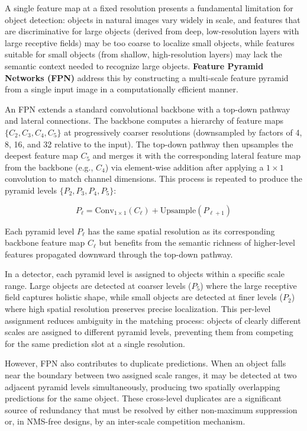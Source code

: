 \label{sec:fpn}

A single feature map at a fixed resolution presents a fundamental limitation for object detection: objects in natural images vary widely in scale, and features that are discriminative for large objects (derived from deep, low-resolution layers with large receptive fields) may be too coarse to localize small objects, while features suitable for small objects (from shallow, high-resolution layers) may lack the semantic context needed to recognize large objects. \textbf{Feature Pyramid Networks (FPN)} \cite{lin2017fpn} address this by constructing a multi-scale feature pyramid from a single input image in a computationally efficient manner.

An FPN extends a standard convolutional backbone with a top-down pathway and lateral connections. The backbone computes a hierarchy of feature maps $\{C_2, C_3, C_4, C_5\}$ at progressively coarser resolutions (downsampled by factors of 4, 8, 16, and 32 relative to the input). The top-down pathway then upsamples the deepest feature map $C_5$ and merges it with the corresponding lateral feature map from the backbone (e.g., $C_4$) via element-wise addition after applying a $1 \times 1$ convolution to match channel dimensions. This process is repeated to produce the pyramid levels $\{P_2, P_3, P_4, P_5\}$:

\begin{equation}
    P_\ell = \text{Conv}_{1\times1}(C_\ell) + \text{Upsample}(P_{\ell+1})
\end{equation}

Each pyramid level $P_\ell$ has the same spatial resolution as its corresponding backbone feature map $C_\ell$ but benefits from the semantic richness of higher-level features propagated downward through the top-down pathway.

In a detector, each pyramid level is assigned to objects within a specific scale range. Large objects are detected at coarser levels ($P_5$) where the large receptive field captures holistic shape, while small objects are detected at finer levels ($P_2$) where high spatial resolution preserves precise localization. This per-level assignment reduces ambiguity in the matching process: objects of clearly different scales are assigned to different pyramid levels, preventing them from competing for the same prediction slot at a single resolution.

However, FPN also contributes to duplicate predictions. When an object falls near the boundary between two assigned scale ranges, it may be detected at two adjacent pyramid levels simultaneously, producing two spatially overlapping predictions for the same object. These cross-level duplicates are a significant source of redundancy that must be resolved by either non-maximum suppression or, in NMS-free designs, by an inter-scale competition mechanism.

